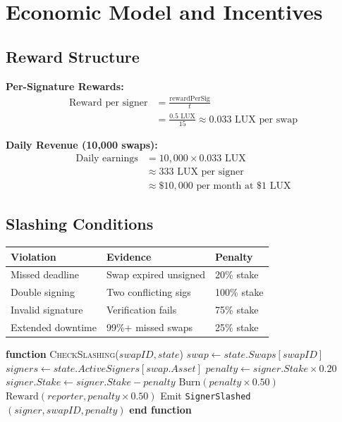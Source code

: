 \section{Economic Model and Incentives}


\subsection{Reward Structure}

\textbf{Per-Signature Rewards:}
\begin{align}
\text{Reward per signer} &= \frac{\text{rewardPerSig}}{t} \\
&= \frac{0.5 \text{ LUX}}{15} \approx 0.033 \text{ LUX per swap}
\end{align}

\textbf{Daily Revenue (10,000 swaps):}
\begin{align}
\text{Daily earnings} &= 10{,}000 \times 0.033 \text{ LUX} \\
&\approx 333 \text{ LUX per signer} \\
&\approx \$10{,}000 \text{ per month at } \$1 \text{ LUX}
\end{align}

\subsection{Slashing Conditions}

\begin{table}[h]
\centering
\begin{tabular}{@{}lll@{}}
\toprule
\textbf{Violation} & \textbf{Evidence} & \textbf{Penalty} \\
\midrule
Missed deadline & Swap expired unsigned & 20\% stake \\
Double signing & Two conflicting sigs & 100\% stake \\
Invalid signature & Verification fails & 75\% stake \\
Extended downtime & 99\%+ missed swaps & 25\% stake \\
\bottomrule
\end{tabular}

\label{tab:slashing}
\end{table}



\begin{algorithmic}[1]
\State \textbf{function} \textsc{CheckSlashing}($swapID, state$)
    \State $swap \gets state.Swaps[swapID]$
            \State $signers \gets state.ActiveSigners[swap.Asset]$
                \State $penalty \gets signer.Stake \times 0.20$
                \State $signer.Stake \gets signer.Stake - penalty$
                \State $\text{Burn}(penalty \times 0.50)$
                \State $\text{Reward}(reporter, penalty \times 0.50)$
                \State Emit \texttt{SignerSlashed}$(signer, swapID, penalty)$
            \EndFor
        \EndIf
    \EndIf
\State \textbf{end function}
\end{algorithmic}


